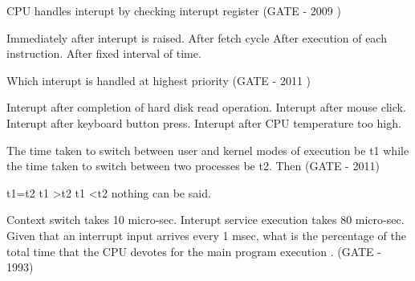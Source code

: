 \begin{questyle}

  \question CPU handles interupt by checking interupt register (GATE - 2009 )

  \begin{choices}
    \choice Immediately after interupt is raised.
    \choice After fetch cycle
    \CorrectChoice After execution of each instruction.
    \choice After fixed interval of time.
  \end{choices}

  \end{questyle}




\begin{questyle}

  \question Which interupt is handled at highest priority (GATE - 2011 )

  \begin{choices}
    \choice Interupt after completion of hard disk read operation.
    \choice Interupt after mouse click.
    \choice Interupt after keyboard button press.
    \CorrectChoice Interupt after CPU temperature too high.
  \end{choices}

  \end{questyle}





\begin{questyle}

  \question The time taken to switch between user and kernel modes of execution be t1 while the time taken to
            switch between two processes be t2. Then (GATE - 2011)

  \begin{oneparchoices}
    \choice t1=t2
    \choice t1 \textgreater  t2
    \CorrectChoice t1 \textless  t2
    \choice nothing can be said.
  \end{oneparchoices}


  \end{questyle}




\begin{questyle}

  \question Context switch takes 10 micro-sec. Interupt service execution takes  80 micro-sec.
          Given that an interrupt input arrives every 1 msec, what is the percentage  of the  total
          time that the CPU devotes for the main program execution \fillin[90\%]. (GATE - 1993)

  \end{questyle}



